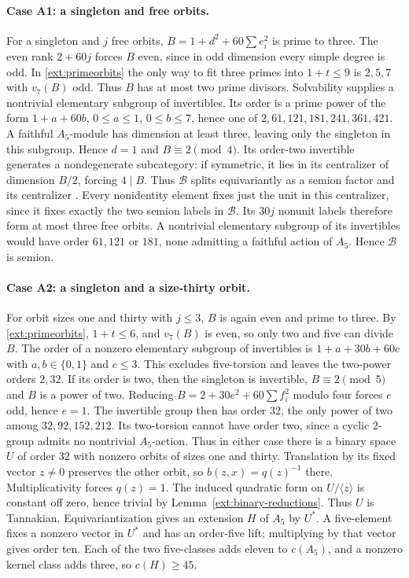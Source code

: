 \documentclass[11pt]{amsart}
\numberwithin{equation}{section}
\theoremstyle{definition}
\theoremstyle{plain}
\begin{document}
\paragraph{Case A1: a singleton and free orbits.}\label{ext:neutral-A1}
For a singleton and $j$ free orbits, $B=1+d^2+60\sum e_i^2$ is prime to three.
The even rank $2+60j$ forces $B$ even, since in odd dimension every
simple degree is odd. In \eqref{ext:primeorbits} the only way to fit
three primes into $1+t\le9$ is $2,5,7$ with $v_7(B)$ odd. Thus $B$
has at most two prime divisors. Solvability supplies a nontrivial
elementary subgroup of invertibles. Its order is a prime power of the
form $1+a+60b$, $0\le a\le1$, $0\le b\le7$, hence one of
$2,61,121,181,241,361,421$. A faithful $A_5$-module has dimension at
least three, leaving only the singleton in this subgroup. Hence $d=1$
and $B\equiv2\pmod4$. Its order-two invertible generates a
nondegenerate subcategory: if symmetric, it lies in its centralizer
of dimension $B/2$, forcing $4\mid B$. Thus $\mathcal B$ splits
equivariantly as a semion factor and its centralizer
\cite[Theorem~3.13]{DGNO}. Every nonidentity element fixes just the
unit in this centralizer, since it fixes exactly the two semion labels
in $\mathcal B$. Its $30j$ nonunit labels therefore form at most three
free orbits. A nontrivial elementary subgroup of its invertibles would
have order $61,121$ or $181$, none admitting a faithful action of $A_5$.
Hence $\mathcal B$ is semion.

\paragraph{Case A2: a singleton and a size-thirty orbit.}\label{ext:neutral-A2}
For orbit sizes one and thirty with $j\le3$, $B$ is again even and prime
to three. By \eqref{ext:primeorbits}, $1+t\le6$, and $v_7(B)$ is even,
so only two and five can divide $B$. The order of a nonzero elementary
subgroup of invertibles is $1+a+30b+60c$ with $a,b\in\{0,1\}$ and
$c\le3$. This excludes five-torsion and leaves the two-power orders
$2,32$. If its order is two, then the singleton is invertible,
$B\equiv2\pmod5$ and $B$ is a power of two. Reducing
$B=2+30e^2+60\sum f_i^2$ modulo four forces $e$ odd, hence $e=1$.
The invertible group then has order $32$, the only power of two among
$32,92,152,212$. Its two-torsion cannot have order two, since a cyclic
$2$-group admits no nontrivial $A_5$-action. Thus in either case
there is a binary space $U$ of order $32$ with nonzero orbits of sizes
one and thirty. Translation by its fixed vector $z\ne0$ preserves
the other orbit, so $b(z,x)=q(z)^{-1}$ there. Multiplicativity forces
$q(z)=1$. The induced quadratic form on $U/\langle z\rangle$ is
constant off zero, hence trivial by Lemma~\ref{ext:binary-reductions}.
Thus $U$ is Tannakian. Equivariantization gives an extension $H$ of
$A_5$ by $U^*$. A five-element fixes a nonzero vector in $U^*$ and has
an order-five lift; multiplying by that vector gives order ten.
Each of the two five-classes adds eleven to $c(A_5)$, and a nonzero
kernel class adds three, so $c(H)\ge45$.
\end{document}

